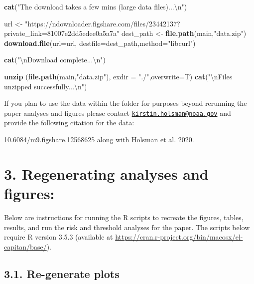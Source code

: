 \documentclass[]{article}
\newenvironment{Shaded}{\begin{snugshade}}{\end{snugshade}}
\newcommand{\KeywordTok}[1]{\textcolor[rgb]{0.13,0.29,0.53}{\textbf{{#1}}}}
\newcommand{\DataTypeTok}[1]{\textcolor[rgb]{0.13,0.29,0.53}{{#1}}}
\newcommand{\CharTok}[1]{\textcolor[rgb]{0.31,0.60,0.02}{{#1}}}
\newcommand{\StringTok}[1]{\textcolor[rgb]{0.31,0.60,0.02}{{#1}}}
\newcommand{\NormalTok}[1]{{#1}}
\begin{document}
\begin{Shaded}
\begin{Highlighting}[]
    \KeywordTok{cat}\NormalTok{(}\StringTok{"The download takes a few mins (large data files)...}\CharTok{\textbackslash{}n}\StringTok{"}\NormalTok{)}

    \NormalTok{url <-}\StringTok{  "https://ndownloader.figshare.com/files/23442137?private_link=81007e2dd5edee0a5a7a"}
    \NormalTok{dest_path  <-}\StringTok{  }\KeywordTok{file.path}\NormalTok{(main,}\StringTok{"data.zip"}\NormalTok{)}
    \KeywordTok{download.file}\NormalTok{(}\DataTypeTok{url=}\NormalTok{url, }\DataTypeTok{destfile=}\NormalTok{dest_path,}\DataTypeTok{method=}\StringTok{"libcurl"}\NormalTok{)}
    
    \KeywordTok{cat}\NormalTok{(}\StringTok{"}\CharTok{\textbackslash{}n}\StringTok{Download complete...}\CharTok{\textbackslash{}n}\StringTok{"}\NormalTok{)}
    
    \KeywordTok{unzip} \NormalTok{(}\KeywordTok{file.path}\NormalTok{(main,}\StringTok{"data.zip"}\NormalTok{), }\DataTypeTok{exdir =} \StringTok{"./"}\NormalTok{,}\DataTypeTok{overwrite=}\NormalTok{T)}
    \KeywordTok{cat}\NormalTok{(}\StringTok{"}\CharTok{\textbackslash{}n}\StringTok{Files unzipped successfully...}\CharTok{\textbackslash{}n}\StringTok{"}\NormalTok{)}
\end{Highlighting}
\end{Shaded}

If you plan to use the data within the folder for purposes beyond
rerunning the paper analyses and figures please contact
\href{mailto:kirstin.holsman@noaa.gov}{\nolinkurl{kirstin.holsman@noaa.gov}}
and provide the following citation for the data:

10.6084/m9.figshare.12568625 along with Holsman et al. 2020.

\section{3. Regenerating analyses and
figures:}\label{regenerating-analyses-and-figures}

Below are instructions for running the R scripts to recreate the
figures, tables, results, and run the risk and threshold analyses for
the paper. The scripts below require R version 3.5.3 (available at
\url{https://cran.r-project.org/bin/macosx/el-capitan/base/}).

\subsection{3.1. Re-generate plots}\label{re-generate-plots}
\end{document}
